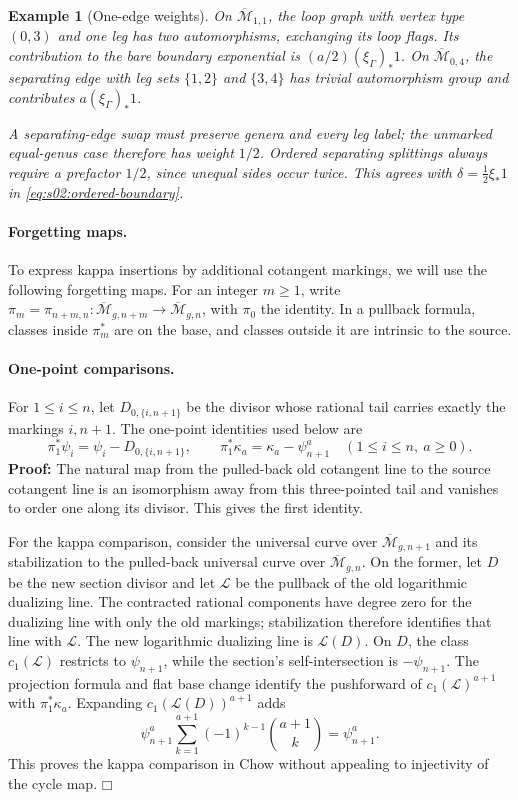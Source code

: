 \documentclass[a4paper,10pt]{article}
\numberwithin{equation}{section}
\newcommand{\MM}{\overline{\mathcal{M}}}
\theoremstyle{paperplain}
\theoremstyle{paperremark}
\newtheorem{exm}{Example}[section]
\theoremstyle{paperplain}
\newenvironment{prf}{\noindent \textbf{Proof: }}{\hfill $\mdlgwhtsquare$\par\addvspace{0.5\baselineskip}}
\begin{document}
\begin{exm}[One-edge weights]
\label{exm:s02:one-edge-weights}
On $\MM_{1,1}$, the loop graph with vertex type $(0,3)$ and one leg
has two automorphisms, exchanging its loop flags.  Its contribution
to the bare boundary exponential is $(a/2)(\xi_\Gamma)_*1$.
On $\MM_{0,4}$, the separating edge with leg sets $\{1,2\}$ and
$\{3,4\}$ has trivial automorphism group and contributes
$a(\xi_\Gamma)_*1$.

A separating-edge swap must preserve genera and every leg label;
the unmarked equal-genus case therefore has weight $1/2$.
Ordered separating splittings always require a prefactor $1/2$,
since unequal sides occur twice.  This agrees with
$\delta=\frac12\xi_*1$ in \eqref{eq:s02:ordered-boundary}.
\end{exm}

\paragraph{Forgetting maps.}
To express kappa insertions by additional cotangent markings, we will
use the following forgetting maps.
For an integer $m\geq1$, write
$\pi_m=\pi_{n+m,n}:\MM_{g,n+m}\to\MM_{g,n}$, with
$\pi_0$ the identity.  In a pullback formula, classes inside
$\pi_m^*$ are on the base, and classes outside it are intrinsic to
the source.

\paragraph{One-point comparisons.}
For $1\leq i\leq n$, let
$D_{0,\{i,n+1\}}$ be the divisor whose rational tail carries exactly
the markings $i,n+1$.  The one-point identities used below are
\begin{equation}
\label{eq:s02:one-point-comparison}
\pi_1^*\psi_i=\psi_i-D_{0,\{i,n+1\}},\qquad
\pi_1^*\kappa_a=\kappa_a-\psi_{n+1}^a
\quad(1\leq i\leq n,\ a\geq0).
\end{equation}
\begin{prf}
The natural map from the pulled-back old cotangent line to the
source cotangent line is an isomorphism away from this three-pointed
tail and vanishes to order one along its divisor. This gives the
first identity.

For the kappa comparison, consider the universal curve over
$\MM_{g,n+1}$ and its stabilization to the pulled-back universal
curve over $\MM_{g,n}$.  On the former, let $D$ be the new section
divisor and let $\mathcal L$ be the pullback of the old logarithmic
dualizing line.  The contracted rational components have degree zero
for the dualizing line with only the old markings; stabilization
therefore identifies that line with $\mathcal L$.  The new
logarithmic dualizing line is $\mathcal L(D)$.  On $D$, the class
$c_1(\mathcal L)$ restricts to $\psi_{n+1}$, while the section's
self-intersection is $-\psi_{n+1}$.  The projection formula and flat
base change identify the pushforward of $c_1(\mathcal L)^{a+1}$
with $\pi_1^*\kappa_a$.  Expanding $c_1(\mathcal L(D))^{a+1}$ adds
\[
\psi_{n+1}^a\sum_{k=1}^{a+1}(-1)^{k-1}\binom{a+1}{k}
=\psi_{n+1}^a.
\]
This proves the kappa comparison in Chow without appealing to
injectivity of the cycle map.
\end{prf}
\end{document}
